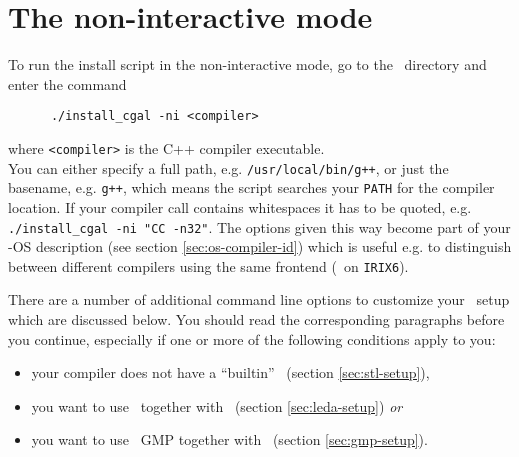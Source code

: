 
\section{The non-interactive mode}\label{sec:non-interactive}

To run the install script in the non-interactive mode, go to the
\cgaldir\ directory and enter the command
\begin{verbatim}
      ./install_cgal -ni <compiler>
\end{verbatim}
where \texttt{<compiler>} is the C++ compiler executable.\\
You can either specify a full path, e.g. \texttt{/usr/local/bin/g++},
or just the basename, e.g. \texttt{g++}, which means the script
searches your \texttt{PATH} for the compiler location. If your
compiler call contains whitespaces it has to be quoted, e.g.
\texttt{./install\_cgal -ni "CC -n32"}.  The options given this way
become part of your \cgal-OS description (see section
\ref{sec:os-compiler-id}) which is useful e.g. to distinguish between
different compilers using the same frontend (\mipsprocc\ on
\texttt{IRIX6}).

There are a number of additional command line options to customize
your \cgal\ setup which are discussed below. You should read the
corresponding paragraphs before you continue, especially if one or
more of the following conditions apply to you:
\begin{itemize}
\item your compiler does not have a ``builtin'' \stl\ (section
  \ref{sec:stl-setup}),
\item you want to use \leda\ together with \cgal\ (section
  \ref{sec:leda-setup}) \textit{or}
\item you want to use \gnu\ GMP together with \cgal\ (section
  \ref{sec:gmp-setup}).
\end{itemize}


